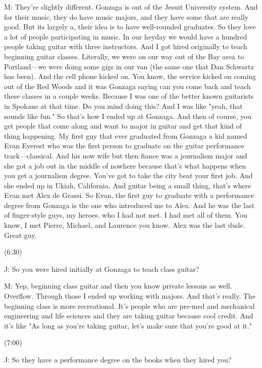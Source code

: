 \documentclass[11pt]{article}
\begin{document}
M: They're slightly different. Gonzaga is out of the Jesuit University system. And for their music, they do have music majors, and they have some that are really good.  But its largely a, their idea is to have well-rounded graduates. So they love a lot of people participating in music. In our heyday we would have a hundred people taking guitar with three instructors. And I got hired originally to teach beginning guitar classes. Literally, we were on our way out of the Bay area to Portland—we were doing some gigs in our van (the same one that Dan Schwartz has been). And the cell phone kicked on. You know, the service kicked on coming out of the Red Woods and it was Gonzaga saying can you come back and teach these classes in a couple weeks. Because I was one of the better known guitarists in Spokane at that time. Do you mind doing this? And I was like "yeah, that sounds like fun." So that's how I ended up at Gonzaga. And then of course, you get people that come along and want to major in guitar and get that kind of thing happening. My first guy that ever graduated from Gonzaga a kid named Evan Everest who was the first person to graduate on the guitar performance track—classical. And his now wife but then fiance was a journalism major and she got a job out in the middle of nowhere because that's what happens when you get a journalism degree.  You've got to take the city beat your first job. And she ended up in Ukiah, California. And guitar being a small thing, that's where Evan met Alex de Grassi. So Evan, the first guy to graduate with a performance degree from Gonzaga is the one who introduced me to Alex. And he was the last of finger-style guys, my heroes, who I had not met. I had met all of them. You know, I met Pierre, Michael, and Laurence you know. Alex was the last dude. Great guy.

(6:30)

J: So you were hired initially at Gonzaga to teach class guitar?

M: Yep, beginning class guitar and then you know private lessons as well. Overflow. Through those I ended up working with majors. And that's really. The beginning class is more recreational. It's people who are pre-med and mechanical engineering and life sciences and they are taking guitar because cool credit. And it's like "As long as you're taking guitar, let's make sure that you're good at it."

(7:00)

J: So they have a performance degree on the books when they hired you?
\end{document}
